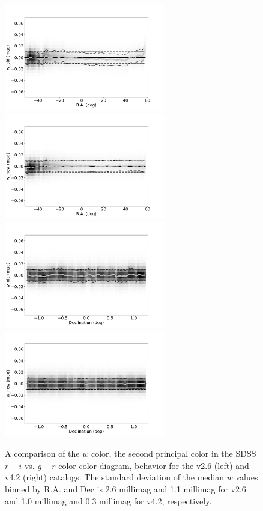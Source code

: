 \documentclass[fleqn,usenatbib]{mnras}
\begin{document}
\begin{figure}
    \centering\includegraphics[width=7cm]{figures/testV26vsV42_r_w_old_RA_Hess.png}
    \centering\includegraphics[width=7cm]{figures/testV26vsV42_r_w_new_RA_Hess.png}
    \centering\includegraphics[width=7cm]{figures/testV26vsV42_r_w_old_Dec_Hess.png}
    \centering\includegraphics[width=7cm]{figures/testV26vsV42_r_w_new_Dec_Hess.png}
\caption{A comparison of the $w$ color, the second principal color in the SDSS
$r-i$ vs. $g-r$ color-color diagram, behavior for the v2.6 (left) and v4.2 (right)
catalogs. The standard deviation of the median $w$ values binned by R.A. and Dec
is 2.6 millimag and 1.1 millimag for v2.6 and 1.0 millimag and 0.3 millimag for v4.2,
respectively.}
\label{fig:comparew} 
\end{figure}
 
\end{document}
